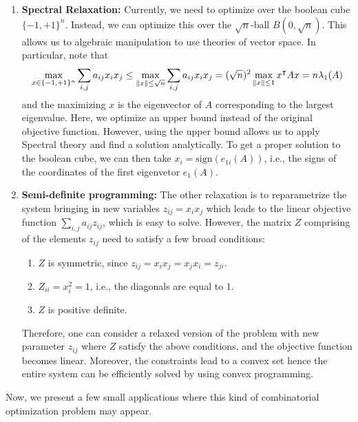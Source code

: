 \documentclass[12pt]{article}
\begin{document}
\begin{enumerate}
    \item \textbf{Spectral Relaxation:} Currently, we need to optimize over the boolean cube $\{-1, +1\}^n$. Instead, we can optimize this over the $\sqrt{n}$-ball $B(0, \sqrt{n})$. This allows us to algebraic manipulation to use theories of vector space. In particular, note that 
    \begin{equation*}
        \max_{x \in \{-1, +1\}^n} \sum_{i,j} a_{ij}x_i x_j \leq \max_{\left\Vert x \right\Vert \leq \sqrt{n}} \sum_{i,j} a_{ij}x_ix_j = (\sqrt{n})^2 \max_{\left\Vert x \right\Vert \leq 1} x^{\intercal} Ax = n \lambda_1(A)
    \end{equation*}
    \noindent and the maximizing $x$ is the eigenvector of $A$ corresponding to the largest eigenvalue. Here, we optimize an upper bound instead of the original objective function. However, using the upper bound allows us to apply Spectral theory and find a solution analytically. To get a proper solution to the boolean cube, we can then take $x_i = \text{sign}(e_{1i}(A))$, i.e., the signs of the coordinates of the first eigenvetor $e_1(A)$.
    \item \textbf{Semi-definite programming:} The other relaxation is to reparametrize the system bringing in new variables $z_{ij} = x_i x_j$ which leads to the linear objective function $\sum_{i,j}a_{ij}z_{ij}$, which is easy to solve. However, the matrix $Z$ comprising of the elements $z_{ij}$ need to satisfy a few broad conditions:
    \begin{enumerate}
        \item $Z$ is symmetric, since $z_{ij} = x_i x_j = x_j x_i = z_{ji}$.
        \item $Z_{ii} = x_i^2 = 1$, i.e., the diagonals are equal to $1$.
        \item $Z$ is positive definite.
    \end{enumerate}
    \noindent Therefore, one can consider a relaxed version of the problem with new parameter $z_{ij}$ where $Z$ satisfy the above conditions, and the objective function becomes linear. Moreover, the constraints lead to a convex set hence the entire system can be efficiently solved by using convex programming.
\end{enumerate}

\noindent Now, we present a few small applications where this kind of combinatorial optimization problem may appear.
\end{document}
